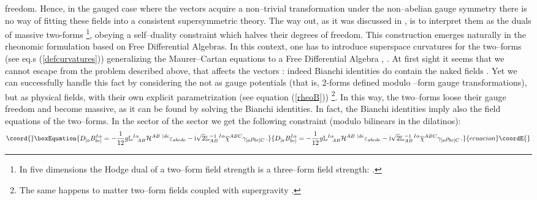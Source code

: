 \documentclass[a4paper,12pt]{article}
\def\bar{\overline}\end {picture}}
\begin{document}
freedom. Hence, in the gauged case where the \coordHE{} vectors
\coordHE{} acquire a non--trivial transformation under the
non--abelian gauge symmetry there is no way of fitting these
fields into a  consistent supersymmetric theory. The way out, as
it was discussed in \cite{gunwar}, is to interpret them as the
duals of massive two-forms \coordHE{} \footnote{In five
dimensions the Hodge dual of a two--form field strength is a
three--form field strength:
\coordHE{}.}, obeying a self--duality constraint which halves
their degrees of freedom. This construction emerges naturally in
the rheonomic formulation based on Free Differential Algebras. In
this context, one has to introduce superspace curvatures for the
two--forms (see eq.s (\ref{defcurvatures})) generalizing the
Maurer--Cartan equations to a Free Differential Algebra
\cite{castdauriafre}, \cite{Fre:1984pc}. At first sight it seems
that we cannot escape from the problem described above, that
affects the vectors \coordHE{}:  indeed Bianchi identities do
contain the naked fields \coordHE{}. Yet we can successfully
handle this fact by considering the \coordHE{} not as gauge
potentials (that is, 2-forms defined modulo \coordHE{}--form gauge
transformations), but as physical fields, with their own explicit
parametrization (see equation (\ref{rheoB})) \footnote{The same
happens to matter two--form fields coupled with \coordHE{}
supergravity \cite{Ceresole:2000jd}.}. In this way, the two--forms
loose their gauge freedom and become massive, as it can be found
by solving the Bianchi identities. In fact, the Bianchi identities
imply also  the field equations of the two--forms. In the
 \myHighlight{$\bar{\psi}^A\wedge\gamma^a\psi_A$}\coordHE{} sector of the \coordHE{} sector we get the
 following constraint (modulo bilinears in the dilatinos):
\begin{equation}\coord{}\boxEquation{
\label{eqmotB} D_{[a}B^{I\alpha}_{bc]}= -{1\over 12} g
\mathbb{L}^{I\alpha}_{~~AB}\mathcal{H}^{AB~|de}\varepsilon_{abcde}
-{\rm
i}\sqrt{2}\mathbb{L}^{-1~I\alpha}_{AB}\bar{\chi}^{ABC}\gamma_{[a}\rho
_{bc]C}\,.
}{
D_{[a}B^{I\alpha}_{bc]}= -{1\over 12} g
\mathbb{L}^{I\alpha}_{~~AB}\mathcal{H}^{AB~|de}\varepsilon_{abcde}
-{\rm
i}\sqrt{2}\mathbb{L}^{-1~I\alpha}_{AB}\bar{\chi}^{ABC}\gamma_{[a}\rho
_{bc]C}\,.
}{ecuacion}\coordE{}\end{equation}
\end{document}
